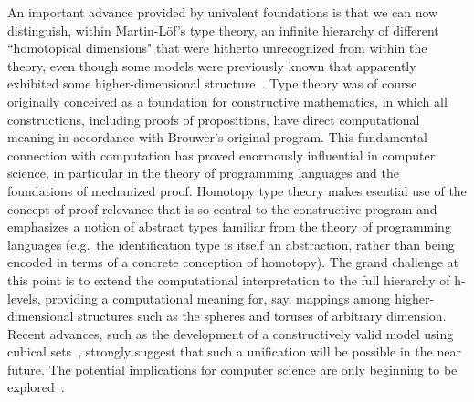 \documentclass[11pt]{article}
\theoremstyle{remark}
\theoremstyle{definition}
\begin{document}
An important advance provided by univalent foundations is that we can now distinguish, within Martin-L\"{o}f's type theory, an infinite hierarchy of different ``homotopical dimensions" that were hitherto unrecognized from within the theory, even though some models were previously known that apparently exhibited some higher-dimensional structure~\cite{hofmann-streicher}.  Type theory was of course originally conceived as a foundation for
constructive mathematics, in which all constructions, including proofs of propositions, have direct computational
meaning in accordance with Brouwer's original program.  This fundamental connection with computation has proved enormously
influential in computer science, in particular in the theory of programming languages and the foundations of mechanized
proof.  Homotopy type theory makes esential use of the concept of proof relevance that is so central to the constructive
program %
and emphasizes a notion of abstract types familiar from the theory of programming languages (e.g.\ the identification type is itself an abstraction, rather than being encoded in terms of a concrete conception of homotopy).  The grand challenge at this point is to extend the
computational interpretation to the full hierarchy of h-levels, providing a computational meaning for, say, mappings
among higher-dimensional structures such as the spheres and toruses of arbitrary dimension.  Recent advances, such as
the development of a constructively valid model using cubical sets~\cite{bch}, strongly suggest that such a unification
will be possible in the near future.  The potential implications for computer science are only beginning to be explored~\cite{patch-theory}.
%
\end{document}
